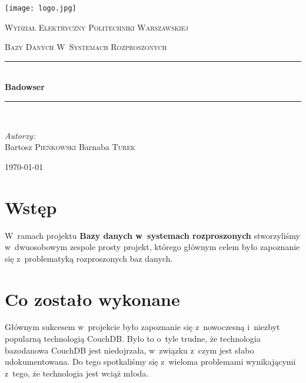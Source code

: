 \documentclass[a4paper]{article}
\newcommand{\HRule}{\rule{\linewidth}{0.5mm}}
\begin{document}
\begin{titlepage}
  
  \begin{center}
    
    
    \texttt{[image: logo.jpg]}\\[1cm]    
    
    \begin{onehalfspace}
    \textsc{\LARGE Wydział Elektryczny Politechniki Warszawskiej}\\[1.5cm]
    \end{onehalfspace}
    

    
    \textsc{\Large Bazy Danych W~Systemach Rozproszonych}\\[0.5cm]
    
    
    \HRule \\[0.4cm]
    { \huge \bfseries Badowser}\\[0.2cm]
    \HRule \\[1.5cm]
    
    \begin{minipage}{0.4\textwidth}
      \begin{flushleft} \large
        \emph{Autorzy:}\\
        Bartosz \textsc{Pieńkowski}
        Barnaba \textsc{Turek}
      \end{flushleft}
    \end{minipage}
    \vfill
    
    {\large \today}
    
  \end{center}
  
\end{titlepage}
\sloppy

\section{Wstęp}
W~ramach projektu \textbf{Bazy danych w~systemach rozproszonych} stworzyliśmy w~dwuosobowym zespole prosty projekt,
którego głównym celem było zapoznanie się z~problematyką rozproszonych baz danych.

\section{Co zostało wykonane}
Głównym sukcesem w~projekcie było zapoznanie się z~nowoczesną i~niezbyt popularną technologią CouchDB.
Było to o~tyle trudne, że technologia bazodanowa CouchDB jest niedojrzała, w~związku z~czym jest słabo udokumentowana.
Do tego spotkaliśmy się z~wieloma problemami wynikającymi z~tego, że technologia jest wciąż młoda.
\end{document}
